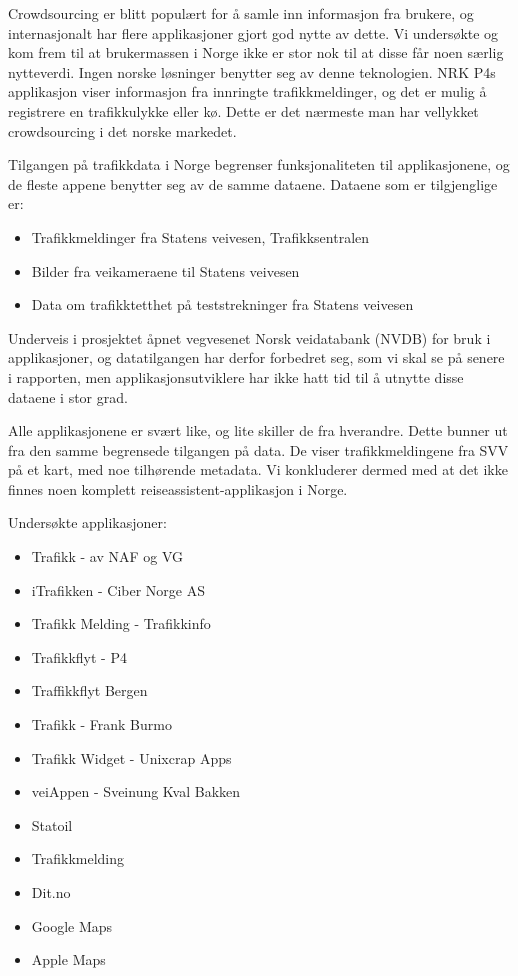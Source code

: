 \documentclass[a4paper,norsk,oneside]{book}
\begin{document}
Crowdsourcing er blitt populært for å samle inn informasjon fra brukere, og internasjonalt har flere applikasjoner gjort god nytte av dette. Vi undersøkte og kom frem til at brukermassen i Norge ikke er stor nok til at disse får noen særlig nytteverdi. Ingen norske løsninger benytter seg av denne teknologien. NRK P4s applikasjon viser informasjon fra innringte trafikkmeldinger, og det er mulig å registrere en trafikkulykke eller kø. Dette er det nærmeste man har vellykket crowdsourcing i det norske markedet.

Tilgangen på trafikkdata i Norge begrenser funksjonaliteten til applikasjonene, og de fleste appene benytter seg av de samme dataene. Dataene som er tilgjenglige er:

\begin{itemize}
\item Trafikkmeldinger fra Statens veivesen, Trafikksentralen
\item Bilder fra veikameraene til Statens veivesen
\item Data om trafikktetthet på teststrekninger fra Statens veivesen
\end{itemize}
Underveis i prosjektet åpnet vegvesenet Norsk veidatabank (NVDB) for bruk i applikasjoner, og datatilgangen har derfor forbedret seg, som vi skal se på senere i rapporten, men applikasjonsutviklere har ikke hatt tid til å utnytte disse dataene i stor grad.

Alle applikasjonene er svært like, og lite skiller de fra hverandre. Dette bunner ut fra den samme begrensede tilgangen på data. De viser trafikkmeldingene fra SVV på et kart, med noe tilhørende metadata. Vi konkluderer dermed med at det ikke finnes noen komplett reiseassistent-applikasjon i Norge.

Undersøkte applikasjoner:

\begin{itemize}
\item Trafikk - av NAF og VG
\item iTrafikken - Ciber Norge AS
\item Trafikk Melding - Trafikkinfo
\item Trafikkflyt - P4
\item Traffikkflyt Bergen
\item Trafikk - Frank Burmo
\item Trafikk Widget - Unixcrap Apps
\item veiAppen - Sveinung Kval Bakken
\item Statoil
\item Trafikkmelding
\item Dit.no
\item Google Maps
\item Apple Maps
\end{itemize}
\end{document}
